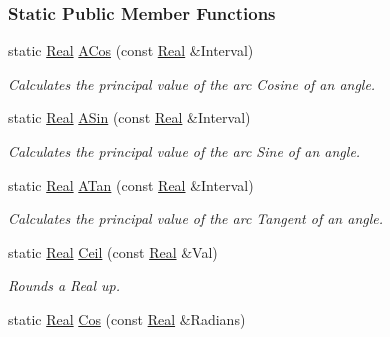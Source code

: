 \subsubsection*{Static Public Member Functions}
\begin{DoxyCompactItemize}
\item 
static \hyperlink{namespaceMezzanine_a726731b1a7df72bf3583e4a97282c6f6}{Real} \hyperlink{classMezzanine_1_1MathTool_a036cff4360b503b4bee33dc74f5324c4}{ACos} (const \hyperlink{namespaceMezzanine_a726731b1a7df72bf3583e4a97282c6f6}{Real} \&Interval)
\begin{DoxyCompactList}\small\item\em Calculates the principal value of the arc Cosine of an angle. \item\end{DoxyCompactList}\item 
static \hyperlink{namespaceMezzanine_a726731b1a7df72bf3583e4a97282c6f6}{Real} \hyperlink{classMezzanine_1_1MathTool_ab2397336a5d7ffc9510a92313f6ef214}{ASin} (const \hyperlink{namespaceMezzanine_a726731b1a7df72bf3583e4a97282c6f6}{Real} \&Interval)
\begin{DoxyCompactList}\small\item\em Calculates the principal value of the arc Sine of an angle. \item\end{DoxyCompactList}\item 
static \hyperlink{namespaceMezzanine_a726731b1a7df72bf3583e4a97282c6f6}{Real} \hyperlink{classMezzanine_1_1MathTool_a89b1afe525d990b2136aae8b516b0980}{ATan} (const \hyperlink{namespaceMezzanine_a726731b1a7df72bf3583e4a97282c6f6}{Real} \&Interval)
\begin{DoxyCompactList}\small\item\em Calculates the principal value of the arc Tangent of an angle. \item\end{DoxyCompactList}\item 
static \hyperlink{namespaceMezzanine_a726731b1a7df72bf3583e4a97282c6f6}{Real} \hyperlink{classMezzanine_1_1MathTool_a3201e1e4dc3f7383c983861513cd0379}{Ceil} (const \hyperlink{namespaceMezzanine_a726731b1a7df72bf3583e4a97282c6f6}{Real} \&Val)
\begin{DoxyCompactList}\small\item\em Rounds a Real up. \item\end{DoxyCompactList}\item 
static \hyperlink{namespaceMezzanine_a726731b1a7df72bf3583e4a97282c6f6}{Real} \hyperlink{classMezzanine_1_1MathTool_a7848194232dda5086ba2c4d4888d0ffc}{Cos} (const \hyperlink{namespaceMezzanine_a726731b1a7df72bf3583e4a97282c6f6}{Real} \&Radians)

\end{DoxyCompactItemize}
